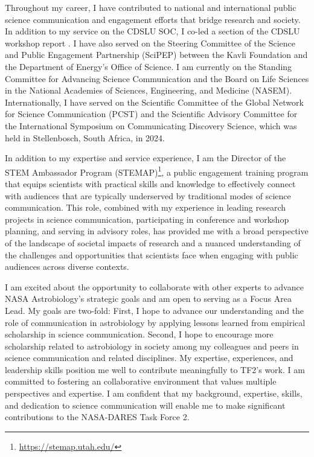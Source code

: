 \documentclass[12pt]{letter}
\begin{document}
Throughout my career, I have contributed to national and international public science communication and engagement efforts that bridge research and society. In addition to my service on the CDSLU SOC, I co-led a section of the CDSLU workshop report \parencite{bimmWorkshopReportCommunicatingforthcoming}. I have also served on the Steering Committee of the Science and Public Engagement Partnership (SciPEP) between the Kavli Foundation and the Department of Energy's Office of Science. I am currently on the Standing Committee for Advancing Science Communication and the Board on Life Sciences in the National Academies of Sciences, Engineering, and Medicine (NASEM). Internationally, I have served on the Scientific Committee of the Global Network for Science Communication (PCST) and the Scientific Advisory Committee for the International Symposium on Communicating Discovery Science, which was held in Stellenbosch, South Africa, in 2024.

In addition to my expertise and service experience, I am the Director of the STEM Ambassador Program (STEMAP)\footnote{\href{https://stemap.utah.edu/}{https://stemap.utah.edu/}}, a public engagement training program that equips scientists with practical skills and knowledge to effectively connect with audiences that are typically underserved by traditional modes of science communication. This role, combined with my experience in leading research projects in science communication, participating in conference and workshop planning, and serving in advisory roles, has provided me with a broad perspective of the landscape of societal impacts of research and a nuanced understanding of the challenges and opportunities that scientists face when engaging with public audiences across diverse contexts.

I am excited about the opportunity to collaborate with other experts to advance NASA Astrobiology's strategic goals and am open to serving as a Focus Area Lead. My goals are two-fold: First, I hope to advance our understanding and the role of communication in astrobiology by applying lessons learned from empirical scholarship in science communication. Second, I hope to encourage more scholarship related to astrobiology in society among my colleagues and peers in science communication and related disciplines. My expertise, experiences, and leadership skills position me well to contribute meaningfully to TF2's work. I am committed to fostering an collaborative environment that values multiple perspectives and expertise. I am confident that my background, expertise, skills, and dedication to science communication will enable me to make significant contributions to the NASA-DARES Task Force 2.
\end{document}
